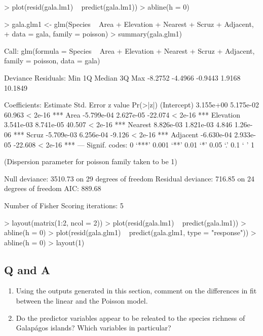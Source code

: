 \documentclass[a4paper,10pt]{article}
\begin{document}
\begin{Schunk}
\begin{Sinput}
> plot(resid(gala.lm1) ~ predict(gala.lm1))
> abline(h = 0)
\end{Sinput}
\end{Schunk}

\begin{Schunk}
\begin{Sinput}
> gala.glm1 <- glm(Species ~ Area + Elevation + Nearest + Scruz + Adjacent,
+                  data = gala, family = poisson)
> summary(gala.glm1)
\end{Sinput}
\begin{Soutput}
Call:
glm(formula = Species ~ Area + Elevation + Nearest + Scruz + 
    Adjacent, family = poisson, data = gala)

Deviance Residuals: 
    Min       1Q   Median       3Q      Max  
-8.2752  -4.4966  -0.9443   1.9168  10.1849  

Coefficients:
              Estimate Std. Error z value Pr(>|z|)    
(Intercept)  3.155e+00  5.175e-02  60.963  < 2e-16 ***
Area        -5.799e-04  2.627e-05 -22.074  < 2e-16 ***
Elevation    3.541e-03  8.741e-05  40.507  < 2e-16 ***
Nearest      8.826e-03  1.821e-03   4.846 1.26e-06 ***
Scruz       -5.709e-03  6.256e-04  -9.126  < 2e-16 ***
Adjacent    -6.630e-04  2.933e-05 -22.608  < 2e-16 ***
---
Signif. codes:  0 ‘***’ 0.001 ‘**’ 0.01 ‘*’ 0.05 ‘.’ 0.1 ‘ ’ 1

(Dispersion parameter for poisson family taken to be 1)

    Null deviance: 3510.73  on 29  degrees of freedom
Residual deviance:  716.85  on 24  degrees of freedom
AIC: 889.68

Number of Fisher Scoring iterations: 5
\end{Soutput}
\end{Schunk}

\begin{Schunk}
\begin{Sinput}
> layout(matrix(1:2, ncol = 2))
> plot(resid(gala.lm1) ~ predict(gala.lm1))
> abline(h = 0)
> plot(resid(gala.glm1) ~ predict(gala.glm1, type = "response"))
> abline(h = 0)
> layout(1)
\end{Sinput}
\end{Schunk}

\subsection*{Q and A}
\begin{enumerate}
\item Using the outputs generated in this section, comment on the differences in fit between the linear and the Poisson model.
\item Do the predictor variables appear to be releated to the species richness of Galap\'{a}gos islands? Which variables in particular?
\end{enumerate}
\end{document}
